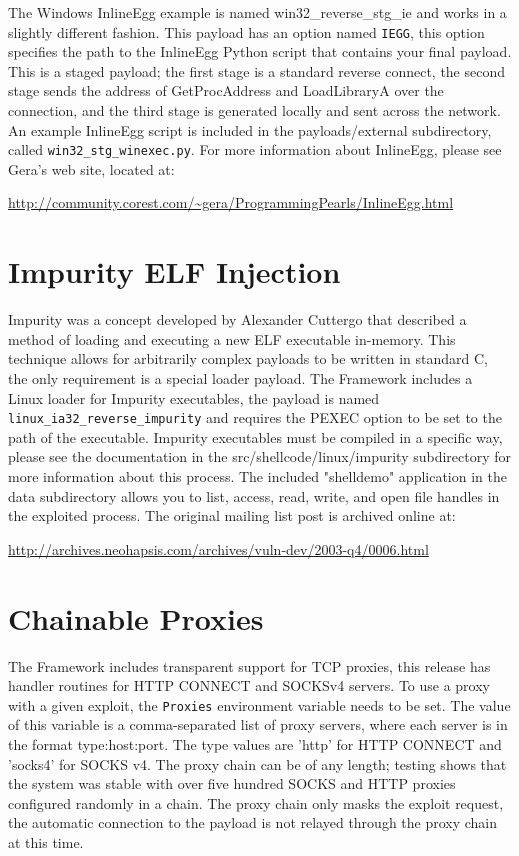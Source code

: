 \documentclass{report}
\begin{document}
\par
The Windows InlineEgg example is named win32\_reverse\_stg\_ie and works in a
slightly different fashion. This payload has an option named \texttt{IEGG}, this option
specifies the path to the InlineEgg Python script that contains your final
payload. This is a staged payload; the first stage is a standard reverse
connect, the second stage sends the address of GetProcAddress and LoadLibraryA
over the connection, and the third stage is generated locally and sent across
the network. An example InlineEgg script is included in the payloads/external
subdirectory, called \texttt{win32\_stg\_winexec.py}. For more information about
InlineEgg, please see Gera's web site, located at: 

\url{http://community.corest.com/~gera/ProgrammingPearls/InlineEgg.html}


\section{Impurity ELF Injection}
\par
Impurity was a concept developed by Alexander Cuttergo that described a method
of loading and executing a new ELF executable in-memory. This technique allows
for arbitrarily complex payloads to be written in standard C, the only
requirement is a special loader payload. The Framework includes a Linux loader
for Impurity executables, the payload is named
\texttt{linux\_ia32\_reverse\_impurity} and requires the PEXEC option to be set
to the path of the executable. Impurity executables must be compiled in a
specific way, please see the documentation in the src/shellcode/linux/impurity
subdirectory for more information about this process. The included "shelldemo"
application in the data subdirectory allows you to list, access, read, write,
and open file handles in the exploited process. The original mailing list post
is archived online at:   

\url{http://archives.neohapsis.com/archives/vuln-dev/2003-q4/0006.html}


\section{Chainable Proxies}
\par
The Framework includes transparent support for TCP proxies, this release has
handler routines for HTTP CONNECT and SOCKSv4 servers. To use a proxy with a
given exploit, the \texttt{Proxies} environment variable needs to be set. The value of
this variable is a comma-separated list of proxy servers, where each server is
in the format type:host:port. The type values are 'http' for HTTP CONNECT and
'socks4' for SOCKS v4. The proxy chain can be of any length; testing shows that
the system was stable with over five hundred SOCKS and HTTP proxies configured
randomly in a chain. The proxy chain only masks the exploit request, the
automatic connection to the payload is not relayed through the proxy chain at
this time. 
\end{document}
